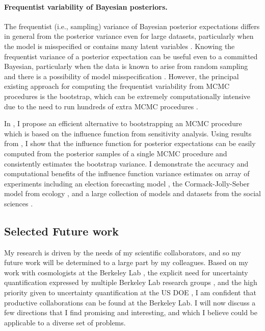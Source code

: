 \paragraph{Frequentist variability of Bayesian posteriors.}

The frequentist (i.e., sampling) variance of Bayesian posterior expectations
differs in general from the posterior variance even for large datasets,
particularly when the model is misspecified or contains many latent variables
\citep{kleijn:2006:misspecification}.
Knowing the frequentist variance of a posterior expectation can be useful even
to a committed Bayesian, particularly when the data is known to arise from
random sampling and there is a possibility of model misspecification
\citep{waddell:2002:bayesphyloboot}.  However, the
principal existing approach for computing the frequentist variability from MCMC
procedures is the bootstrap, which can be extremely computationally intensive
due to the need to run hundreds of extra MCMC procedures
\citep{huggins:2019:bayesbag}.

In \citep{giordano:2020:bayesij, giordano:2020:stanconbayesij}, I propose an
efficient alternative to bootstrapping an MCMC procedure which is based on the
influence function from sensitivity analysis.  Using results from
\citep{giordano:2018:covariances, giordano:2019:ij}, I show that the influence
function for posterior expectations can be easily computed from the posterior
samples of a single MCMC procedure and consistently estimates the bootstrap
variance. I demonstrate the accuracy and computational benefits of the influence
function variance estimates on array of experiments including an election
forecasting model \citep{economist:2020:election}, the Cormack-Jolly-Seber model
from ecology \citep{kery:2011:bayesian}, and a large collection of models and
datasets from the social sciences \citep{gelman:2006:arm}.



\subsection*{Selected Future work}

My research is driven by the needs of my scientific collaborators, and so my
future work will be determined to a large part by my colleagues. Based on my
work with cosmologists at the Berkeley Lab \citep{regier:2019:cataloging}, the
explicit need for uncertainty quantification expressed by multiple Berkeley Lab
research groups \citep[Section 6.2]{committee:2020:report}, and the high
priority given to uncertainty quantification at the US DOE
\citep{lbnl:2019:foa}, I am confident that productive collaborations can be
found at the Berkeley Lab. I will now discuss a few directions that I find
promising and interesting, and which I believe could be applicable to a diverse
set of problems.

